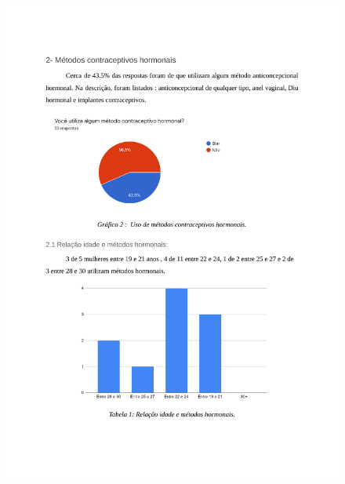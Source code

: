 \begin{apendicesenv}
    \begin{figure}[h]
        \centering
        \includegraphics[keepaspectratio=true,scale=0.7]{figuras/Tab2.pdf}
    \end{figure}
    

\end{apendicesenv}
